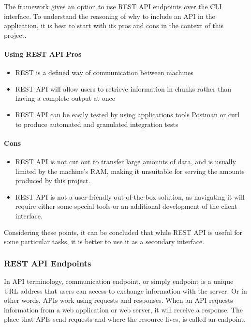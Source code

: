 \documentclass[thesis=M,english,hidelinks]{FITthesis}[2019/12/23]
\begin{document}
The framework gives an option to use REST API endpoints over the CLI interface. To understand the reasoning of why to include an API in the application, it is best to start with its pros and cons in the context of this project.

\paragraph{Using REST API Pros}
\begin{itemize}
	\item REST is a defined way of communication between machines
	\item REST API will allow users to retrieve information in chunks rather than having a complete output at once
	\item REST API can be easily tested by using applications tools Postman or curl to produce automated and granulated integration tests
\end{itemize}

\paragraph{Cons}
\begin{itemize}
	\item REST API is not cut out to transfer large amounts of data, and is usually limited by the machine's RAM, making it unsuitable for serving the amounts produced by this project.
	\item REST API is not a user-friendly out-of-the-box solution, as navigating it will require either some special tools or an additional development of the client interface.
\end{itemize}

Considering these points, it can be concluded that while \gls{REST} \gls{API} is useful for some particular tasks, it is better to use it as a secondary interface. 

\subsubsection{REST API Endpoints}

In \gls{API} terminology, communication endpoint, or simply endpoint is a unique URL address that users can access to exchange information with the server. Or in other words, APIs work using requests and responses. When an API requests information from a web application or web server, it will receive a response. The place that APIs send requests and where the resource lives, is called an endpoint. 
\end{document}
